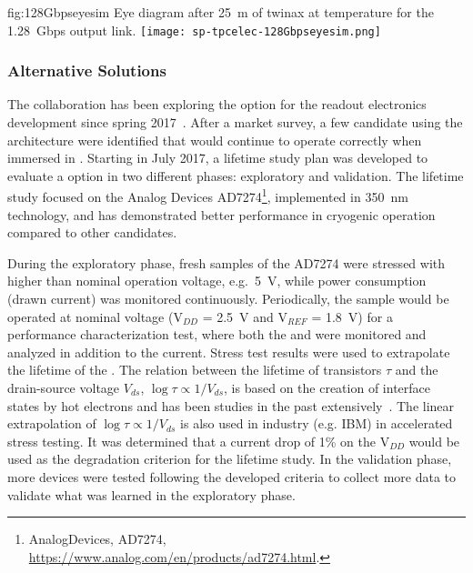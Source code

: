 \begin{dunefigure}
{fig:128Gbpseyesim}
{Eye diagram after \SI{25}{m} of  twinax at \lntwo
temperature for the  \SI{1.28}{Gbps} output link.}  
\texttt{[image: sp-tpcelec-128Gbpseyesim.png]}
\end{dunefigure}


\subsubsection{Alternative  Solutions}
\label{sec:fdsp-tpcelec-design-asic-alternatives}

\label{sec:fdsp-tpcelec-design-femb-alt-cots}

The  collaboration has been exploring the   option 
for the  readout electronics development since spring
2017~\cite{Chen:2018zic}. After a market survey, a few candidate  
using the  architecture were identified that would continue
to operate correctly when immersed in \lntwo. Starting in
July 2017, a lifetime study plan was developed to evaluate a  
 option in two different phases: exploratory and validation. The 
lifetime study focused on the Analog Devices AD7274\footnote{AnalogDevices,
  AD7274\texttrademark{}, \url{https://www.analog.com/en/products/ad7274.html}.},
implemented in  \SI{350}{nm}  technology, and has
demonstrated better performance in cryogenic operation compared to other candidates.

During the exploratory phase, fresh samples of the   
AD7274 were stressed with higher than nominal operation voltage, e.g.~\SI{5}{V},
while power consumption (drawn current) was monitored continuously. 
Periodically, the sample would be operated at nominal voltage (V$_{DD}$ = \SI{2.5}{V} 
and V$_{REF}$ = \SI{1.8}{V}) for a performance characterization test, where 
both the  and  were monitored and analyzed in addition 
to the current. Stress test results were used to extrapolate the 
lifetime of the  . The relation between the lifetime 
of  transistors $\tau$ and the drain-source voltage $V_{ds}$, 
$\log\tau\propto1/V_{ds}$, is based on the creation of interface states by hot 
electrons and has been studies in the past extensively~\cite{Li:CELAr}.
The linear extrapolation of $\log\tau\propto1/V_{ds}$ is also used in industry (e.g. IBM) 
in accelerated stress testing. It was determined that a current drop 
of \num{1}\% on the V$_{DD}$ would be used as the degradation criterion for the lifetime 
study. In the validation phase, more devices were tested following the developed 
criteria to collect more data to validate what was learned in the exploratory phase.

